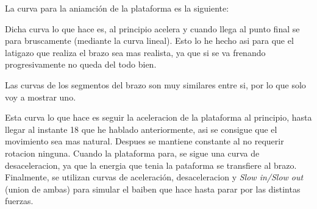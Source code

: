 \documentclass{article}
\begin{document}
La curva para la aniamción de la plataforma es la siguiente:


Dicha curva lo que hace es, al principio acelera y cuando llega al punto final se para bruscamente (mediante la curva lineal). Esto lo he hecho asi para que el latigazo que realiza el brazo sea mas realista, ya que si se va frenando progresivamente no queda del todo bien.

Las curvas de los segmentos del brazo son muy similares entre si, por lo que solo voy a mostrar uno.


Esta curva lo que hace es seguir la aceleracion de la plataforma al principio, hasta llegar al instante 18 que he hablado anteriormente, asi se consigue que el movimiento sea mas natural. Despues se mantiene constante al no requerir rotacion ninguna. Cuando la plataforma para, se sigue una curva de desaceleracion, ya que la energia que tenia la pataforma se transfiere al brazo. Finalmente, se utilizan curvas de aceleración, desaceleracion y \textit{Slow in/Slow out} (union de ambas) para simular el baiben que hace hasta parar por las distintas fuerzas.
\end{document}
